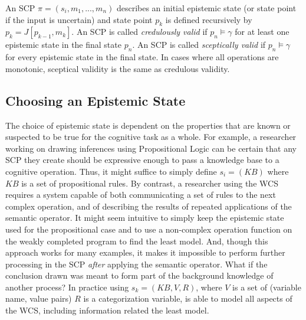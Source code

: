 \documentclass{article}
\begin{document}
An SCP $\pi=(s_i,m_1,...,m_n)$ describes an initial epistemic state (or state point if the input is uncertain) and state point $p_k$ is defined recursively by $p_k = J[p_{k-1},m_k]$. An SCP is called \textit{credulously valid} if $p_n \models \gamma$ for at least one epistemic state in the final state $p_n$. An SCP is called \textit{sceptically valid} if $p_n \models \gamma$ for every epistemic state in the final state. In cases where all operations are monotonic, sceptical validity is the same as credulous validity.


\subsection{Choosing an Epistemic State}
The choice of epistemic state is dependent on the properties that are known or suspected to be true for the cognitive task as a whole. For example, a researcher working on drawing inferences using Propositional Logic can be certain that any SCP they create should be expressive enough to pass a knowledge base to a cognitive operation. Thus, it might suffice to simply define $s_i=(KB)$ where $KB$ is a set of propositional rules. By contrast, a researcher using the WCS requires a system capable of both communicating a set of rules to the next complex operation, and of describing the results of repeated applications of the semantic operator. It might seem intuitive to simply keep the epistemic state used for the propositional case and to use a non-complex operation function on the weakly completed program to find the least model. And, though this approach works for many examples, it makes it impossible to perform further processing in the SCP \textit{after} applying the semantic operator. What if the conclusion drawn was meant to form part of the background knowledge of another process? In practice using $s_k=(KB,V, R)$, where $V$ is a set of (variable name, value pairs) $R$ is a categorization variable, is able to model all aspects of the WCS, including information related the least model. 
\end{document}
